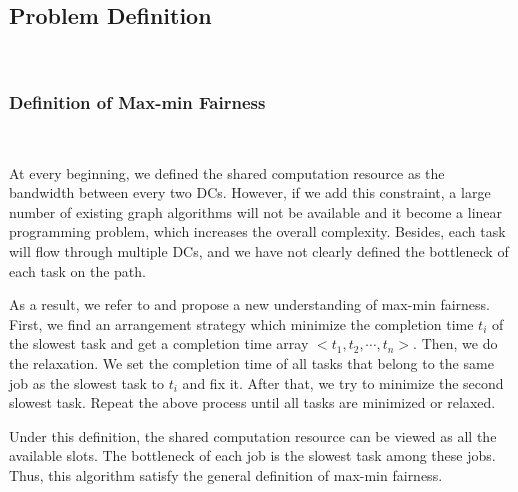 \subsection{Problem Definition}\label{section:prblem definition}
~\par

\subsubsection{Definition of Max-min Fairness}
\label{max-min}
~\par
At every beginning, we defined the shared computation resource as the bandwidth between every two DCs. However, if we add this constraint, a large number of existing graph algorithms will not be available and it become a linear programming problem, which increases the overall complexity. Besides, each task will flow through multiple DCs, and we have not clearly defined the bottleneck of each task on the path.

As a result, we refer to \cite{LP-paper} and propose a new understanding of max-min fairness. First, we find an arrangement strategy which minimize the completion time $t_i$ of the slowest task and get a completion time array $<t_1,t_2,\cdots,t_n>$. Then, we do the relaxation. We set the completion time of all tasks that belong to the same job as the slowest task to $t_i$ and fix it. After that, we try to minimize the second slowest task. Repeat the above process until all tasks are minimized or relaxed. 

Under this definition, the shared computation resource can be viewed as all the available slots. The bottleneck of each job is the slowest task among these jobs. Thus, this algorithm satisfy the general definition of max-min fairness.
